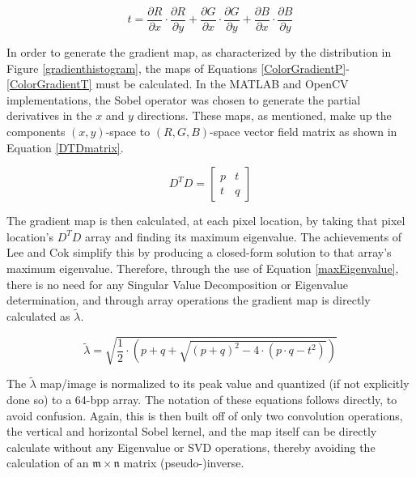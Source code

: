 \begin{equation}
t = \frac{\partial R}{\partial x}\cdot\frac{\partial R}{\partial y} + 
	\frac{\partial G}{\partial x}\cdot\frac{\partial G}{\partial y} +
	\frac{\partial B}{\partial x}\cdot\frac{\partial B}{\partial y}
\label{ColorGradientT}
\end{equation}

In order to generate the gradient map, as characterized by the distribution in Figure \ref{gradienthistogram}, the maps of Equations \ref{ColorGradientP}-\ref{ColorGradientT} must be calculated. In the MATLAB\textsuperscript{\textregistered} and OpenCV implementations, the Sobel operator was chosen to generate the partial derivatives in the $x$ and $y$ directions. These maps, as mentioned, make up the components $(x,y)$-space to $(R,G,B)$-space vector field matrix as shown in Equation \ref{DTDmatrix}.

\begin{equation}
D^{T}D = 
\begin{bmatrix}
p & t \\ t & q
\end{bmatrix}
\label{DTDmatrix}
\end{equation}

The gradient map is then calculated, at each pixel location, by taking that pixel location's $D^{T}D$ array and finding its maximum eigenvalue. The achievements of Lee and Cok \cite{Lee1991} simplify this by producing a closed-form solution to that array's maximum eigenvalue. Therefore, through the use of Equation \ref{maxEigenvalue}, there is no need for any Singular Value Decomposition or Eigenvalue determination, and through array operations the gradient map is directly calculated as $\tilde{\lambda}$.

\begin{equation}
\tilde{\lambda} = \sqrt{ \frac{1}{2} \cdot \left( p + q + \sqrt{ (p+q)^2 - 4 \cdot ( p \cdot q - t^2 ) } \right) }
\label{maxEigenvalue}
\end{equation}

The $\tilde{\lambda}$ map/image is normalized to its peak value and quantized (if not explicitly done so) to a 64-bpp array. The notation of these equations follows \cite{Lee1991} directly, to avoid confusion. Again, this is then built off of only two convolution operations, the vertical and horizontal Sobel kernel, and the map itself can be directly calculate without any Eigenvalue or SVD operations, thereby avoiding the calculation of an $\mathfrak{m} \times \mathfrak{n}$ matrix (pseudo-)inverse.



